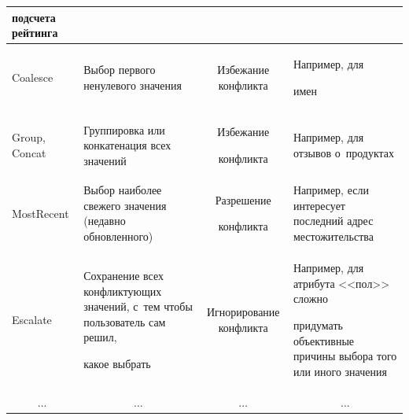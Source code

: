 \begin{table}
\begin{center}
\begin{tabular}{|l|p{34mm}|c|p{40mm}|}
подсчета рейтинга\\

\hline

Coalesce&Выбор первого ненулевого значения&Избежание конфликта&Например, для

имен\\

\hline

Group, Concat&Группировка или конкатенация всех значений&Избежание

конфликта&Например, для отзывов о~продуктах\\

\hline

MostRecent&Выбор наиболее свежего значения (недавно обновленного)&Разрешение

конфликта&Например, если интересует последний адрес местожительства\\

\hline

Escalate&Сохранение всех конфликтующих значений, с~тем чтобы пользователь сам решил,

какое выбрать&Игнорирование конфликта&Например, для атрибута <<пол>> сложно

придумать объективные причины выбора того или иного значения\\

\hline

\multicolumn{1}{|c|}{$\ldots$}&\multicolumn{1}{c|}{$\ldots$}&

\multicolumn{1}{|c|}{$\ldots$}&\multicolumn{1}{c|}{$\ldots$}\\

\hline

\end{tabular}

\end{center}

\end{table}



